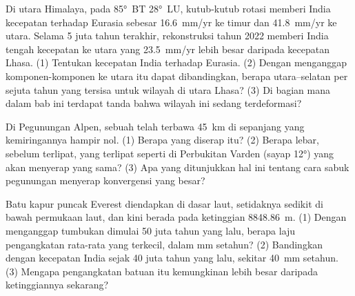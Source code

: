 \begin{exercise}[$\star\star\star$]\label{exo:g12:mountain-building:13}
Di utara Himalaya, pada \ang{85}~BT \ang{28}~LU, kutub-kutub rotasi memberi
India kecepatan terhadap Eurasia sebesar \qty{16.6}{mm/yr} ke timur dan
\qty{41.8}{mm/yr} ke utara. Selama 5 juta tahun terakhir, rekonstruksi tahun
2022 memberi India tengah kecepatan ke utara yang \qty{23.5}{mm/yr} lebih
besar daripada kecepatan Lhasa. (1) Tentukan kecepatan India terhadap Eurasia.
(2) Dengan menganggap komponen-komponen ke utara itu dapat dibandingkan,
berapa  utara--selatan per sejuta tahun yang tersisa untuk wilayah
di utara Lhasa? (3) Di bagian mana dalam bab ini terdapat tanda bahwa wilayah
ini sedang terdeformasi?
\end{exercise}

\begin{exercise}[$\star\star\star$]\label{exo:g12:mountain-building:14}
Di Pegunungan Alpen, sebuah  telah terbawa \qty{45}{km} di sepanjang
 yang kemiringannya hampir nol. (1) Berapa  yang diserap
 itu? (2) Berapa lebar, sebelum terlipat,  yang
terlipat seperti di Perbukitan Varden (sayap \ang{12}) yang akan menyerap
 yang sama? (3) Apa yang ditunjukkan hal ini tentang cara sabuk
pegunungan menyerap konvergensi yang besar?
\end{exercise}

\begin{exercise}[$\star\star\star$]\label{exo:g12:mountain-building:15}
Batu kapur puncak Everest diendapkan di dasar laut, setidaknya sedikit di bawah
permukaan laut, dan kini berada pada ketinggian \qty{8848.86}{m}. (1) Dengan
menganggap tumbukan dimulai 50 juta tahun yang lalu, berapa laju pengangkatan
rata-rata yang terkecil, dalam \unit{mm} setahun? (2) Bandingkan dengan
kecepatan India sejak 40 juta tahun yang lalu, sekitar \qty{40}{mm} setahun.
(3) Mengapa pengangkatan batuan itu kemungkinan lebih besar daripada
ketinggiannya sekarang?
\end{exercise}

